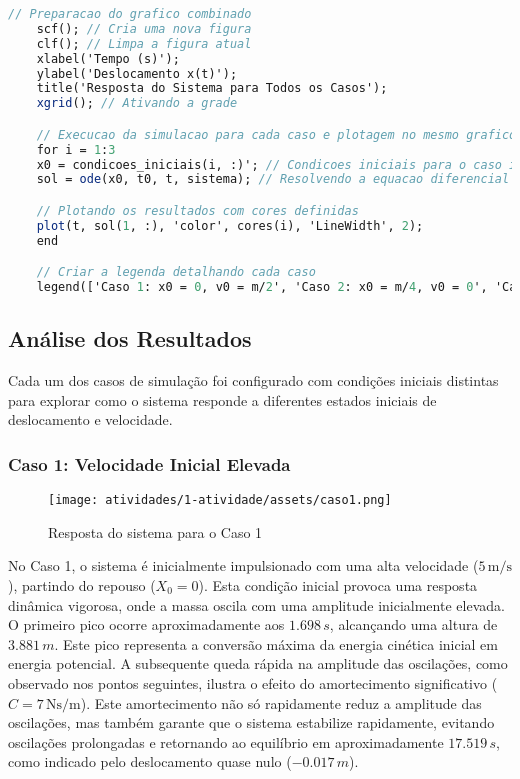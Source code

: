 \begin{lstlisting}[language=Scilab, caption=Código Scilab para simular a resposta do sistema massa-mola-amortecedor]
    // Preparacao do grafico combinado
    scf(); // Cria uma nova figura
    clf(); // Limpa a figura atual
    xlabel('Tempo (s)');
    ylabel('Deslocamento x(t)');
    title('Resposta do Sistema para Todos os Casos');
    xgrid(); // Ativando a grade

    // Execucao da simulacao para cada caso e plotagem no mesmo grafico
    for i = 1:3
    x0 = condicoes_iniciais(i, :)'; // Condicoes iniciais para o caso i (transposto para coluna)
    sol = ode(x0, t0, t, sistema); // Resolvendo a equacao diferencial

    // Plotando os resultados com cores definidas
    plot(t, sol(1, :), 'color', cores(i), 'LineWidth', 2);
    end

    // Criar a legenda detalhando cada caso
    legend(['Caso 1: x0 = 0, v0 = m/2', 'Caso 2: x0 = m/4, v0 = 0', 'Caso 3: x0 = m/5, v0 = m/3'], "location", "best");
\end{lstlisting}

\subsection{Análise dos Resultados}
Cada um dos casos de simulação foi configurado com condições iniciais distintas para explorar como o sistema responde a diferentes estados iniciais de deslocamento e velocidade.

\subsubsection{Caso 1: Velocidade Inicial Elevada}
\begin{figure}[H]
    \centering
    \texttt{[image: atividades/1-atividade/assets/caso1.png]}
    \caption{Resposta do sistema para o Caso 1}
\end{figure}
No Caso 1, o sistema é inicialmente impulsionado com uma alta velocidade (\(5 \, \text{m/s}\)), partindo do repouso (\(X_0 = 0\)). Esta condição inicial provoca uma resposta dinâmica vigorosa, onde a massa oscila com uma amplitude inicialmente elevada. O primeiro pico ocorre aproximadamente aos \(1.698 \, s\), alcançando uma altura de \(3.881 \, m\). Este pico representa a conversão máxima da energia cinética inicial em energia potencial. A subsequente queda rápida na amplitude das oscilações, como observado nos pontos seguintes, ilustra o efeito do amortecimento significativo (\(C = 7 \, \text{Ns/m}\)). Este amortecimento não só rapidamente reduz a amplitude das oscilações, mas também garante que o sistema estabilize rapidamente, evitando oscilações prolongadas e retornando ao equilíbrio em aproximadamente \(17.519 \, s\), como indicado pelo deslocamento quase nulo (\(-0.017 \, m\)).

